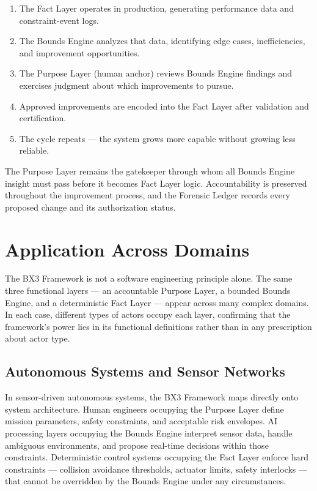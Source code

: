 \documentclass[12pt]{article}
\begin{document}
\begin{enumerate}[noitemsep]
    \item The Fact Layer operates in production, generating performance data and constraint-event logs.
    \item The Bounds Engine analyzes that data, identifying edge cases, inefficiencies, and improvement opportunities.
    \item The Purpose Layer (human anchor) reviews Bounds Engine findings and exercises judgment about which improvements to pursue.
    \item Approved improvements are encoded into the Fact Layer after validation and certification.
    \item The cycle repeats --- the system grows more capable without growing less reliable.
\end{enumerate}

The Purpose Layer remains the gatekeeper through whom all Bounds Engine insight must pass before it becomes Fact Layer logic. Accountability is preserved throughout the improvement process, and the Forensic Ledger records every proposed change and its authorization status.

\section{Application Across Domains}
\label{sec:domains}

The BX3 Framework is not a software engineering principle alone. The same three functional layers --- an accountable Purpose Layer, a bounded Bounds Engine, and a deterministic Fact Layer --- appear across many complex domains. In each case, different types of actors occupy each layer, confirming that the framework's power lies in its functional definitions rather than in any prescription about actor type.

\subsection{Autonomous Systems and Sensor Networks}

In sensor-driven autonomous systems, the BX3 Framework maps directly onto system architecture. Human engineers occupying the Purpose Layer define mission parameters, safety constraints, and acceptable risk envelopes. AI processing layers occupying the Bounds Engine interpret sensor data, handle ambiguous environments, and propose real-time decisions within those constraints. Deterministic control systems occupying the Fact Layer enforce hard constraints --- collision avoidance thresholds, actuator limits, safety interlocks --- that cannot be overridden by the Bounds Engine under any circumstances.
\end{document}
